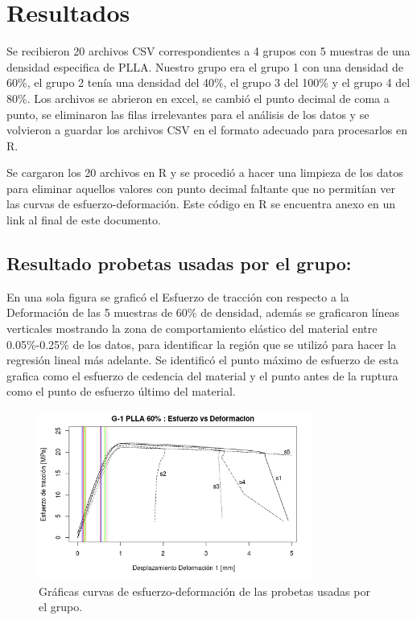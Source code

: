 \documentclass[journal,transmag]{IEEEtran}
\begin{document}
\section{Resultados}
	
Se recibieron 20 archivos CSV correspondientes a 4 grupos con 5 muestras de una densidad especifica de PLLA. Nuestro grupo era el grupo 1 con una densidad de 60\%, el grupo 2 tenía una densidad del 40\%, el grupo 3 del 100\% y el grupo 4 del 80\%. Los archivos se abrieron en excel, se cambió el punto decimal de coma a punto, se eliminaron las filas irrelevantes para el análisis de los datos y se volvieron a guardar los archivos CSV en el formato adecuado para procesarlos en R. 

Se cargaron los 20 archivos en R y se procedió a hacer una limpieza de los datos para eliminar aquellos valores con punto decimal faltante que no permitían ver las curvas de esfuerzo-deformación. Este código en R se encuentra anexo en un link al final de este documento. 

\subsection{Resultado probetas usadas por el grupo: }
En una sola figura se graficó el Esfuerzo de tracción con respecto a la Deformación de las 5 muestras de 60\% de densidad, además se graficaron líneas verticales mostrando la zona de comportamiento elástico del material entre 0.05\%-0.25\% de los datos, para identificar la región que se utilizó para hacer la regresión lineal más adelante. Se identificó el punto máximo de esfuerzo de esta grafica como el esfuerzo de cedencia del material y el punto antes de la ruptura como el punto de esfuerzo último del material. 

	\begin{figure}[!h]
		\center
		\includegraphics[width=9cm]{imagenes/grafica.png}
		\caption{Gráficas curvas de esfuerzo-deformación de las probetas usadas por el grupo.}
		\label{4}
	\end{figure}
	
\end{document}
